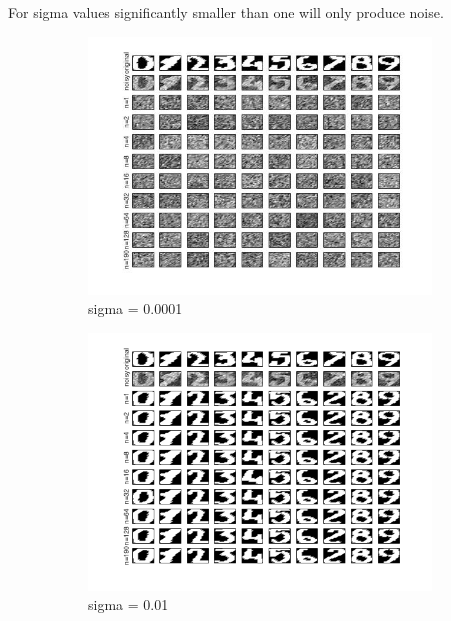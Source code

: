 \documentclass[11pt,oneside,a4paper]{article}
\begin{document}
For sigma values significantly smaller than one will only produce noise. 
\begin{figure}[H]
	\begin{subfigure}[b]{0.4\textwidth}
		\includegraphics[width=\textwidth]{../Figures/0001}
		\caption{sigma = 0.0001}
	\end{subfigure}
	\begin{subfigure}[b]{0.4\textwidth}
		\includegraphics[width=\textwidth]{../Figures/01}
		\caption{sigma = 0.01}
	\end{subfigure}
	\begin{subfigure}[b]{0.4\textwidth}

\end{subfigure}
\end{figure}
\end{document}
